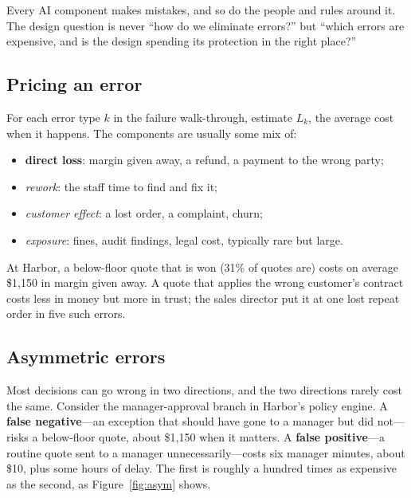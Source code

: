 Every AI component makes mistakes, and so do the people and rules around it. The design question is never ``how do we eliminate errors?'' but ``which errors are expensive, and is the design spending its protection in the right place?''

\subsection{Pricing an error}

For each error type $k$ in the failure walk-through, estimate $L_k$, the average cost when it happens. The components are usually some mix of:
\begin{itemize}[itemsep=1pt]
  \item \textbf{direct loss}: margin given away, a refund, a payment to the wrong party;
  \item \emph{rework}: the staff time to find and fix it;
  \item \emph{customer effect}: a lost order, a complaint, churn;
  \item \emph{exposure}: fines, audit findings, legal cost, typically rare but large.
\end{itemize}
At Harbor, a below-floor quote that is won (31\% of quotes are) costs on average \$1{,}150 in margin given away. A quote that applies the wrong customer's contract costs less in money but more in trust; the sales director put it at one lost repeat order in five such errors.

\subsection{Asymmetric errors}

Most decisions can go wrong in two directions, and the two directions rarely cost the same. Consider the manager-approval branch in Harbor's policy engine. A \textbf{false negative}---an exception that should have gone to a manager but did not---risks a below-floor quote, about \$1{,}150 when it matters. A \textbf{false positive}---a routine quote sent to a manager unnecessarily---costs six manager minutes, about \$10, plus some hours of delay. The first is roughly a hundred times as expensive as the second, as Figure~\ref{fig:asym} shows.

